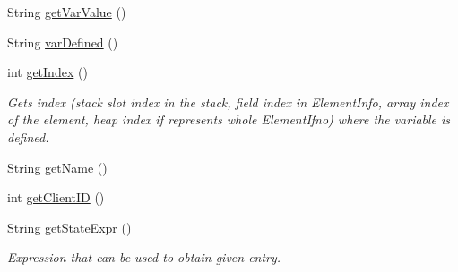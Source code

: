 \begin{DoxyCompactItemize}
\item 
String \hyperlink{classgov_1_1nasa_1_1jpf_1_1inspector_1_1common_1_1pse_1_1_p_s_e_variable_a58c0acb6295c44b5f04af6b04dca0641}{get\+Var\+Value} ()
\item 
String \hyperlink{classgov_1_1nasa_1_1jpf_1_1inspector_1_1common_1_1pse_1_1_p_s_e_variable_aad5dd7fa8129442acd6fa032e1e2f59b}{var\+Defined} ()
\item 
int \hyperlink{classgov_1_1nasa_1_1jpf_1_1inspector_1_1common_1_1pse_1_1_p_s_e_variable_ae8822dec7015fb0e5509dc4f01e18232}{get\+Index} ()
\begin{DoxyCompactList}\small\item\em Gets index (stack slot index in the stack, field index in Element\+Info, array index of the element, heap index if represents whole Element\+Ifno) where the variable is defined. \end{DoxyCompactList}\item 
String \hyperlink{classgov_1_1nasa_1_1jpf_1_1inspector_1_1common_1_1pse_1_1_program_state_entry_ac96b4ceba0c8c9c674b0cca509b63a3b}{get\+Name} ()
\item 
int \hyperlink{classgov_1_1nasa_1_1jpf_1_1inspector_1_1common_1_1pse_1_1_program_state_entry_a5f1b62c50f124c1bd01be0111706a1f5}{get\+Client\+ID} ()
\item 
String \hyperlink{classgov_1_1nasa_1_1jpf_1_1inspector_1_1common_1_1pse_1_1_program_state_entry_a9d819571ca1cc982a7d31df70548fd96}{get\+State\+Expr} ()
\begin{DoxyCompactList}\small\item\em Expression that can be used to obtain given entry. \end{DoxyCompactList}\end{DoxyCompactItemize}
